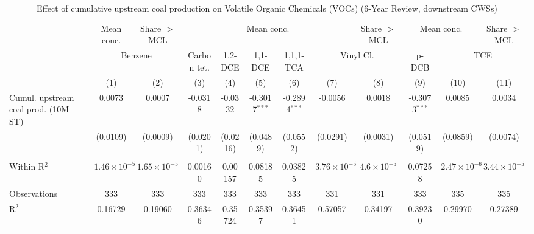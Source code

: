 
\begin{table}[htbp]
   
   \caption{\label{tab:6yr_huc02fe_voc} Effect of cumulative upstream coal production on Volatile Organic Chemicals (VOCs) (6-Year Review, downstream CWSs)}
   \bigskip
   
   \centering
   
   \begin{adjustbox}{width = \textwidth, center}
      
      
      \begin{tabular}{lccccccccccc}
         \toprule
         
          & Mean conc. & Share $>$ MCL & \multicolumn{5}{c}{Mean conc.} & Share $>$ MCL & \multicolumn{2}{c}{Mean conc.} & Share $>$ MCL\\
         
          & \multicolumn{2}{c}{Benzene} & Carbon tet. & 1,2-DCE & 1,1-DCE & 1,1,1-TCA & \multicolumn{2}{c}{Vinyl Cl.} & p-DCB & \multicolumn{2}{c}{TCE} \\ 
         
                                             & (1)                   & (2)                   & (3)           & (4)           & (5)             & (6)             & (7)                   & (8)                  & (9)             & (10)                  & (11)\\  
         
         \midrule 
         Cumul. upstream coal prod. (10M ST) & 0.0073                & 0.0007                & -0.0318       & -0.0332       & -0.3017$^{***}$ & -0.2894$^{***}$ & -0.0056               & 0.0018               & -0.3073$^{***}$ & 0.0085                & 0.0034\\   
                                             & (0.0109)              & (0.0009)              & (0.0201)      & (0.0216)      & (0.0489)        & (0.0552)        & (0.0291)              & (0.0031)             & (0.0519)        & (0.0859)              & (0.0074)\\   
         
          \\
         
         Within R$^2$                        & $1.46\times 10^{-5}$  & $1.65\times 10^{-5}$  & 0.00160       & 0.00157       & 0.08185         & 0.03825         & $3.76\times 10^{-5}$  & $4.6\times 10^{-5}$  & 0.07258         & $2.47\times 10^{-6}$  & $3.44\times 10^{-5}$\\   
         Observations                        & 333                   & 333                   & 333           & 333           & 333             & 333             & 331                   & 331                  & 333             & 335                   & 335\\  
         R$^2$                               & 0.16729               & 0.19060               & 0.36346       & 0.35724       & 0.35397         & 0.36451         & 0.57057               & 0.34197              & 0.39230         & 0.29970               & 0.27389\\  
         

\end{tabular}
\end{adjustbox}
\end{table}
